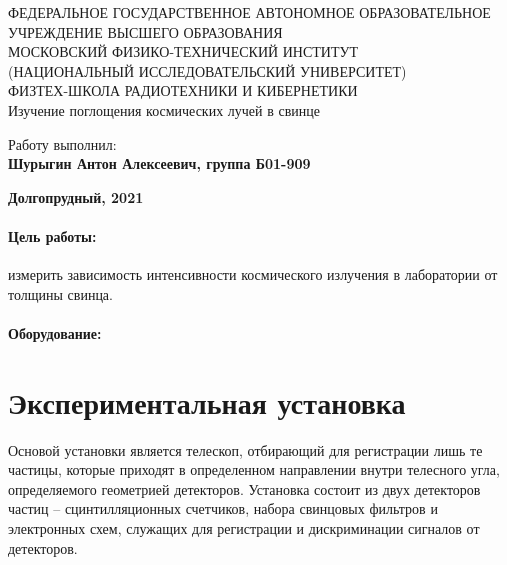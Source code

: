 \documentclass[15pt,a5paper,reqno]{article}
\begin{document}
\begin{center}
  {\small ФЕДЕРАЛЬНОЕ ГОСУДАРСТВЕННОЕ АВТОНОМНОЕ ОБРАЗОВАТЕЛЬНОЕ\\ УЧРЕЖДЕНИЕ ВЫСШЕГО ОБРАЗОВАНИЯ\\ МОСКОВСКИЙ ФИЗИКО-ТЕХНИЧЕСКИЙ ИНСТИТУТ\\ (НАЦИОНАЛЬНЫЙ ИССЛЕДОВАТЕЛЬСКИЙ УНИВЕРСИТЕТ)\\ ФИЗТЕХ-ШКОЛА РАДИОТЕХНИКИ И КИБЕРНЕТИКИ}\\
  \hfill \break
  \hfill \break
  \hfill \break
  \Huge{Изучение поглощения космических лучей в свинце}\\
\end{center}

\hfill \break
\hfill \break
\hfill \break
\hfill \break
\hfill \break
\hfill \break

\begin{flushright}
  \normalsize{Работу выполнил:}\\
  \normalsize{\textbf{Шурыгин Антон Алексеевич, группа Б01-909}}\\
\end{flushright}

\begin{center}
  \normalsize{\textbf{Долгопрудный, 2021}}
\end{center}


\thispagestyle{empty} %


\newpage
\thispagestyle{plain}
\tableofcontents
\thispagestyle{plain}
\newpage


\paragraph{Цель работы:} измерить зависимость интенсивности космического излучения в лаборатории от толщины свинца.
\paragraph{Оборудование:} 


\section{Экспериментальная установка}

Основой установки является телескоп, отбирающий для регистрации лишь те частицы,
которые приходят в определенном направлении внутри телесного угла, определяемого
геометрией детекторов.
Установка состоит из двух детекторов частиц – сцинтилляционных счетчиков, набора
свинцовых фильтров и электронных схем, служащих для регистрации и дискриминации
сигналов от детекторов.
\end{document}
